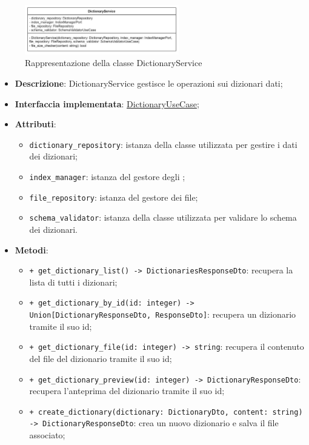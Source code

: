  \label{DictionaryService}
\begin{figure}[H]
    \centering
    \includegraphics[width=0.6\textwidth]{assets/Backend/dictionary_service.png}
    \caption{Rappresentazione della classe DictionaryService}
  \end{figure}
\begin{itemize}
    \item \textbf{Descrizione}: DictionaryService gestisce le operazioni sui dizionari dati;
    \item \textbf{Interfaccia implementata}: \hyperref[DictionaryUseCase]{DictionaryUseCase};
    \item \textbf{Attributi}:
    \begin{itemize}
        \item \texttt{dictionary\_repository}: istanza della classe utilizzata per gestire i dati dei dizionari;
        \item \texttt{index\_manager}: istanza del gestore degli ;
        \item \texttt{file\_repository}: istanza del gestore dei file;
        \item \texttt{schema\_validator}: istanza della classe utilizzata per validare lo schema dei dizionari.
    \end{itemize}
    \item \textbf{Metodi}:
    \begin{itemize}
        \item \texttt{+ get\_dictionary\_list() -> DictionariesResponseDto}: recupera la lista di tutti i dizionari;
        \item \texttt{+ get\_dictionary\_by\_id(id: integer) -> Union[DictionaryResponseDto, ResponseDto]}: recupera un dizionario tramite il suo id;
        \item \texttt{+ get\_dictionary\_file(id: integer) -> string}: recupera il contenuto del file del dizionario tramite il suo id;
        \item \texttt{+ get\_dictionary\_preview(id: integer) -> DictionaryResponseDto}: recupera l'anteprima del dizionario tramite il suo id;
        \item \texttt{+ create\_dictionary(dictionary: DictionaryDto, content: string) -> DictionaryResponseDto}: crea un nuovo dizionario e salva il file associato;

\end{itemize}
\end{itemize}
